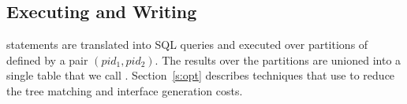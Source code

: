 



\subsection{Executing and Writing \lang}
\label{sec:tool}

\lang statements are translated into SQL queries and executed over partitions of \difftable defined by a pair $(pid_1, pid_2)$.   The results over the partitions are unioned into a single table that we call \diffspil.  Section~\ref{s:opt} describes techniques that use \lang to reduce the tree matching and interface generation costs.

